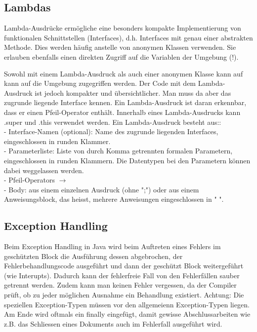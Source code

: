 \subsection{Lambdas}
Lambda-Ausdrücke ermögliche eine besonders kompakte Implementierung von funktionalen Schnittstellen (Interfaces), d.h. Interfaces mit genau einer abstrakten Methode. Dies werden häufig anstelle von  anonymen Klassen verwenden. Sie erlauben ebenfalls einen direkten Zugriff auf die Variablen der Umgebung (!).



Sowohl mit einem Lambda-Ausdruck als auch einer anonymen Klasse kann auf kann auf die Umgebung zugegriffen werden. Der Code mit dem Lambda-Ausdruck ist jedoch kompakter und übersichtlicher. Man muss da aber das zugrunde liegende Interface kennen. Ein Lambda-Ausdruck ist daran erkennbar, dass er einen Pfeil-Operator 
enthält. Innerhalb eines Lambda-Ausdrucks kann .super und .this verwendet werden. 
\newline
\newline
Ein Lambda-Ausdruck besteht aus::\\
- Interface-Namen (optional): Name des zugrunde liegenden 
Interfaces, eingeschlossen in runden Klammer.\\
- Parameterliste: Liste von durch Komma getrennten formalen 
Parametern, eingeschlossen in runden Klammern. Die Datentypen bei den Parametern können dabei weggelassen werden. \\
- Pfeil-Operators  $\rightarrow$ \\
- Body: aus einem einzelnen Ausdruck (ohne ";") oder aus einem Anweisungsblock, das heisst, mehrere Anweisungen eingeschlossen in "{    }".

\subsection{Exception Handling}
Beim Exception Handling in Java wird beim Auftreten eines Fehlers im geschützten Block die Ausführung dessen abgebrochen, der Fehlerbehandlungscode ausgeführt und dann der geschützt Block weitergeführt (wie Interupts). Dadurch kann der fehlerfreie Fall von den Fehlerfällen sauber getrennt werden. Zudem kann man keinen Fehler vergessen, da der Compiler prüft, ob zu jeder möglichen Ausnahme ein Behandlung existiert. Achtung: Die speziellen Exception-Typen müssen vor den allgemeienn Exception-Typen liegen. Am Ende wird oftmals ein finally eingefügt, damit gewisse Abschlussarbeiten wie z.B. das Schliessen eines Dokuments auch im Fehlerfall ausgeführt wird.\\

